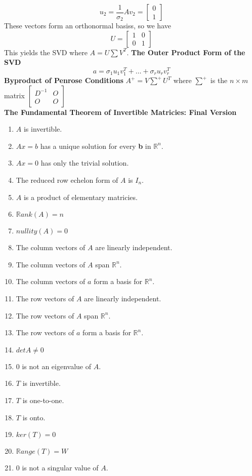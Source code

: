 $$u_2 = \frac{1}{\sigma_2}Av_2 = \begin{bmatrix}
    0\\1
\end{bmatrix}$$
These vectors form an orthonormal basiss, so we have $$U = \begin{bmatrix}
    1&0\\0&1
\end{bmatrix}$$
This yields the SVD where $A = U\sum V^T$.
\textbf{The Outer Product Form of the SVD}
$$a = \sigma_1 u_1v^T_1+\dots+\sigma_r u_rv^T_r$$
\textbf{Byproduct of Penrose Conditions}
$A^+ = V\sum^+U^T$ where $\sum^+$ is the $n\times m$ matrix $\begin{bmatrix}
    D^{-1}&O\\O&O
\end{bmatrix}$ \\
\textbf{The Fundamental Theorem of Invertible Matricies: Final Version}
\begin{enumerate}
    \item $A$ is invertible.
    \item $Ax = b$ has a unique solution for every \textbf{b} in $\mathbb{R}^n$.
    \item $Ax = 0$ has only the trivial solution.
    \item The reduced row echelon form of $A$ is $I_n$.
    \item $A$ is a product of elementary matricies.
    \item $\mathbb{R}ank(A) = n$
    \item $nullity(A) = 0$
    \item The column vectors of $A$ are linearly independent.
    \item The column vectors of $A$ span $\mathbb{R}^n$.
    \item The column vectors of $a$ form a basis for $\mathbb{R}^n$.
    \item The row vectors of $A$ are linearly independent.
    \item The row vectors of $A$ span $\mathbb{R}^n$.
    \item The row vectors of $a$ form a basis for $\mathbb{R}^n$.
    \item $det A \neq 0$
    \item $0$ is not an eigenvalue of $A$.
    \item $T$ is invertible.
    \item $T$ is one-to-one.
    \item $T$ is onto.
    \item $ker(T) = {0}$
    \item $\mathbb{R}ange(T) = W$
    \item $0$ is not a singular value of $A$.
\end{enumerate}

